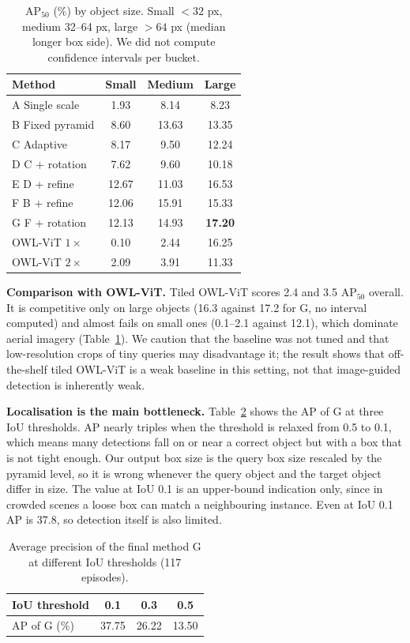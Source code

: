 \documentclass[10pt,twocolumn,letterpaper]{article}
\newcommand{\ap}{AP$_{50}$}
\begin{document}
\begin{table}[t]
\centering\small
\begin{tabular}{@{}lccc@{}}
\toprule
Method & Small & Medium & Large\\
\midrule
A Single scale & 1.93 & 8.14 & 8.23\\
B Fixed pyramid & 8.60 & 13.63 & 13.35\\
C Adaptive & 8.17 & 9.50 & 12.24\\
D C + rotation & 7.62 & 9.60 & 10.18\\
E D + refine & 12.67 & 11.03 & 16.53\\
F B + refine & 12.06 & 15.91 & 15.33\\
G F + rotation & 12.13 & 14.93 & \textbf{17.20}\\
\midrule
OWL-ViT $1\times$ & 0.10 & 2.44 & 16.25\\
OWL-ViT $2\times$ & 2.09 & 3.91 & 11.33\\
\bottomrule
\end{tabular}
\caption{\ap{} (\%) by object size. Small $<32$ px, medium 32--64 px, large $>64$ px (median longer box side). We did not compute confidence intervals per bucket.}
\label{tab:size}
\end{table}

\noindent\textbf{Comparison with OWL-ViT.} Tiled OWL-ViT scores 2.4 and 3.5 \ap{} overall. It is competitive only on large objects (16.3 against 17.2 for G, no interval computed) and almost fails on small ones (0.1--2.1 against 12.1), which dominate aerial imagery (Table~\ref{tab:size}). We caution that the baseline was not tuned and that low-resolution crops of tiny queries may disadvantage it; the result shows that off-the-shelf tiled OWL-ViT is a weak baseline in this setting, not that image-guided detection is inherently weak.

\noindent\textbf{Localisation is the main bottleneck.} Table~\ref{tab:iou} shows the AP of G at three IoU thresholds. AP nearly triples when the threshold is relaxed from 0.5 to 0.1, which means many detections fall on or near a correct object but with a box that is not tight enough. Our output box size is the query box size rescaled by the pyramid level, so it is wrong whenever the query object and the target object differ in size. The value at IoU 0.1 is an upper-bound indication only, since in crowded scenes a loose box can match a neighbouring instance. Even at IoU 0.1 AP is 37.8, so detection itself is also limited.

\begin{table}[t]
\centering\small
\begin{tabular}{@{}lccc@{}}
\toprule
IoU threshold & 0.1 & 0.3 & 0.5\\
\midrule
AP of G (\%) & 37.75 & 26.22 & 13.50\\
\bottomrule
\end{tabular}
\caption{Average precision of the final method G at different IoU thresholds (117 episodes).}
\label{tab:iou}
\end{table}
\end{document}
